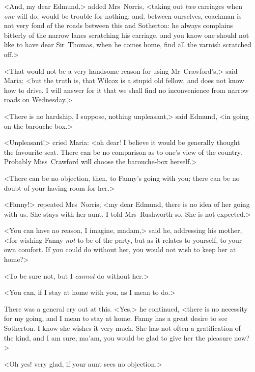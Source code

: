 <And, my dear Edmund,> added Mrs~Norris, <taking out \textit{two}  carriages when \textit{one}  will do, would be trouble for nothing; and, between ourselves, coachman is not very fond of the roads between this and Sotherton: he always complains bitterly of the narrow lanes scratching his carriage, and you know one should not like to have dear Sir~Thomas, when he comes home, find all the varnish scratched off.>

<That would not be a very handsome reason for using Mr~Crawford's,> said Maria; <but the truth is, that Wilcox is a stupid old fellow, and does not know how to drive. I will answer for it that we shall find no inconvenience from narrow roads on Wednesday.>

<There is no hardship, I suppose, nothing unpleasant,> said Edmund, <in going on the barouche box.>

<Unpleasant!> cried Maria: <oh dear! I believe it would be generally thought the favourite seat. There can be no comparison as to one's view of the country. Probably Miss~Crawford will choose the barouche-box herself.>

<There can be no objection, then, to Fanny's going with you; there can be no doubt of your having room for her.>

<Fanny!> repeated Mrs~Norris; <my dear Edmund, there is no idea of her going with us. She stays with her aunt. I told Mrs~Rushworth so. She is not expected.>

<You can have no reason, I imagine, madam,> said he, addressing his mother, <for wishing Fanny \textit{not}  to be of the party, but as it relates to yourself, to your own comfort. If you could do without her, you would not wish to keep her at home?>

<To be sure not, but I \textit{cannot}  do without her.>

<You can, if I stay at home with you, as I mean to do.>

There was a general cry out at this. <Yes,> he continued, <there is no necessity for my going, and I mean to stay at home. Fanny has a great desire to see Sotherton. I know she wishes it very much. She has not often a gratification of the kind, and I am sure, ma'am, you would be glad to give her the pleasure now?>

<Oh yes! very glad, if your aunt sees no objection.>

